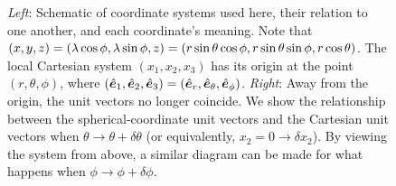 \documentclass[12pt]{article}
\begin{document}
\begin{figure}
	\caption{\textit{Left}: Schematic of coordinate systems used here, their relation to one another, and each coordinate's meaning. Note that $(x,y,z) = (\lambda\cos\phi, \lambda\sin\phi, z) = (r\sin\theta\cos\phi, r\sin\theta\sin\phi, r\cos\theta)$. The local Cartesian system $(x_1,x_2,x_3)$ has its origin at the point $(r,\theta,\phi)$, where $(\hat{\bm{e}}_1,\hat{\bm{e}}_2,\hat{\bm{e}}_3) = (\hat{\bm{e}}_r, \hat{\bm{e}}_\theta, \hat{\bm{e}}_\phi)$. \textit{Right}: Away from the origin, the unit vectors no longer coincide. We show the relationship between the spherical-coordinate unit vectors and the Cartesian unit vectors when $\theta\rightarrow\theta+\delta\theta$ (or equivalently, $x_2=0\rightarrow  \delta x_2$). By viewing the system from above, a similar diagram can be made for what happens when $\phi\rightarrow\phi+\delta\phi$. }
	\label{fig:coords}
\end{figure}
\end{document}
